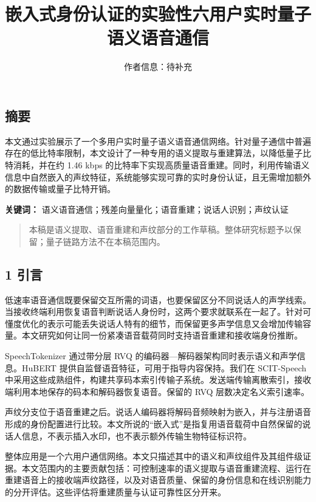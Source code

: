 \documentclass[12pt]{article}
\title{嵌入式身份认证的实验性六用户实时量子语义语音通信}
\author{作者信息：待补充}
\date{}
\begin{document}
\maketitle


\subsection{摘要}\label{ux6458ux8981}

本文通过实验展示了一个多用户实时量子语义语音通信网络。针对量子通信中普遍存在的低比特率限制，本文设计了一种专用的语义提取与重建算法，以降低量子比特消耗，并在约
1.46 kbps
的比特率下实现高质量语音重建。同时，利用传输语义信息中自然嵌入的声纹特征，系统能够实现可靠的实时身份认证，且无需增加额外的数据传输或量子比特开销。

\textbf{关键词：}
语义语音通信；残差向量量化；语音重建；说话人识别；声纹认证

\begin{quote}
本稿是语义提取、语音重建和声纹部分的工作草稿。整体研究标题予以保留；量子链路方法不在本稿范围内。
\end{quote}

\subsection{1 引言}\label{ux5f15ux8a00}

低速率语音通信既要保留交互所需的词语，也要保留区分不同说话人的声学线索。当接收终端利用恢复语音判断说话人身份时，这两个要求就联系在一起了。针对可懂度优化的表示可能丢失说话人特有的细节，而保留更多声学信息又会增加传输容量。本文研究如何让同一份紧凑语音载荷同时支持语音重建和接收端身份推断。

SpeechTokenizer 通过带分层 RVQ
的编码器---解码器架构同时表示语义和声学信息。HuBERT
提供自监督语音特征，可用于指导内容保持。我们在 SCIT-Speech
中采用这些成熟组件，构建共享码本索引传输子系统。发送端传输离散索引，接收端利用本地保存的码本和解码器恢复语音。保留的
RVQ 层数决定名义索引速率。

声纹分支位于语音重建之后。说话人编码器将解码音频映射为嵌入，并与注册语音形成的身份配置进行比较。本文所说的``嵌入式''是指复用语音载荷中自然保留的说话人信息，不表示插入水印，也不表示额外传输生物特征标识符。

整体应用是一个六用户通信网络。本文只描述其中的语义和声纹组件及其组件级证据。本文范围内的主要贡献包括：可控制速率的语义提取与语音重建流程、运行在重建语音上的接收端声纹路径，以及对语音质量、保留的身份信息和在线识别能力的分开评估。这些评估将重建质量与认证可靠性区分开来。
\end{document}
